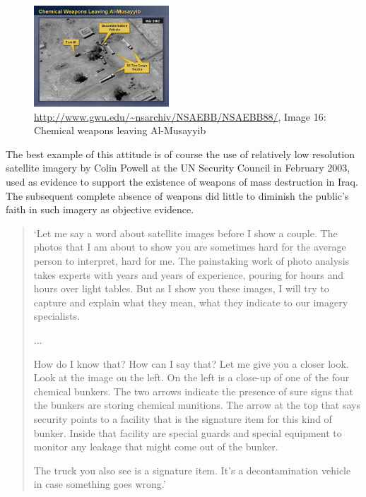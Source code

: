 \documentclass[11pt]{report}
\begin{document}
\begin{figure}
	\begin{flushright}
		\includegraphics[width=0.45\textwidth]{images/iraq-image-16.jpg}
		\caption{\url{http://www.gwu.edu/~nsarchiv/NSAEBB/NSAEBB88/}, Image 16: Chemical weapons leaving Al-Musayyib}
	\end{flushright}
\end{figure}

The best example of this attitude is of course the use of relatively low resolution satellite imagery by Colin Powell at the UN Security Council in February 2003, used as evidence to support the existence of weapons of mass destruction in Iraq. The subsequent complete absence of weapons did little to diminish the public's faith in such imagery as objective evidence. 

\begin{quote}
`Let me say a word about satellite images before I show a couple. The photos that I am about to show you are sometimes hard for the average person to interpret, hard for me. The painstaking work of photo analysis takes experts with years and years of experience, pouring for hours and hours over light tables. But as I show you these images, I will try to capture and explain what they mean, what they indicate to our imagery specialists.

...

How do I know that? How can I say that? Let me give you a closer look. Look at the image on the left. On the left is a close-up of one of the four chemical bunkers. The two arrows indicate the presence of sure signs that the bunkers are storing chemical munitions. The arrow at the top that says security points to a facility that is the signature item for this kind of bunker. Inside that facility are special guards and special equipment to monitor any leakage that might come out of the bunker.

The truck you also see is a signature item. It's a decontamination vehicle in case something goes wrong.'
\cite{guardian2003powell}
\end{quote}
\end{document}

